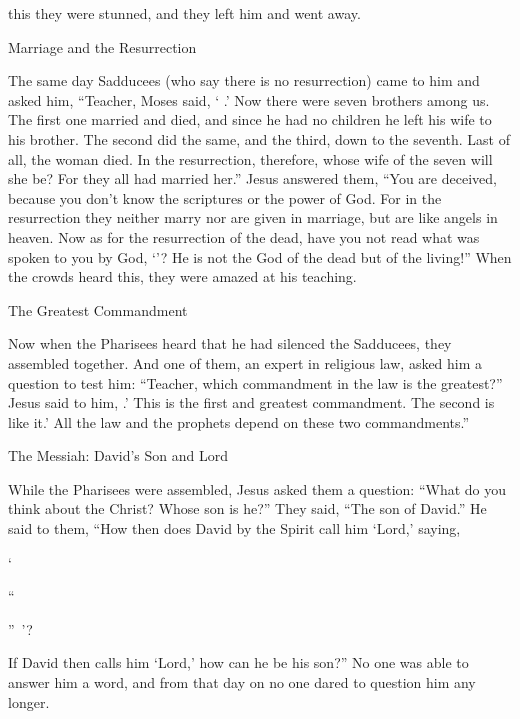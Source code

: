 {this they were stunned,
and
they left
him
and went away.
\par }{\SH Marriage and the Resurrection
\par }{\PP {}The same
day
Sadducees
(who say
there is
no
resurrection) came
to him
and
asked
him,
“Teacher,
Moses
said, ‘{}
{}.’
Now there were
seven
brothers
among
us.
The first one
married
and
died,
and
since he had
no
children
he left
his
wife
to his
brother.
The second
did the same,
and
the third,
down to
the seventh.
Last
of all,
the woman
died.
In
the resurrection,
therefore,
whose
wife of the seven
will
she
be? For
they
all
had married
her.”
Jesus
answered
them,
“You are deceived,
because you don’t
know
the scriptures
or
the power
of God.
For
in
the resurrection
they
neither
marry
nor
are given in marriage,
but
are
like
angels
in
heaven.
Now as for
the resurrection
of the dead,
have you
not
read
what was spoken
to you
by
God,
‘{}’? He is
not
the God
of the dead
but
of the living!”
When
the crowds
heard
this, they were amazed
at
his
teaching.
\par }{\SH The Greatest Commandment
\par }{\PP {}Now
when
the Pharisees
heard
that
he had silenced
the Sadducees,
they assembled together.
And
one
of
them,
an expert in religious law,
asked
him a question to test
him:
“Teacher,
which
commandment
in
the law
is the greatest?”
Jesus said
to him,
{}.’
This
is
the first
and
greatest
commandment.
The second
is like
it{}.’
All
the law
and
the prophets
depend
on
these
two
commandments.”
\par }{\SH The Messiah: David’s Son and Lord
\par }{\PP {}While
the Pharisees
were assembled,
Jesus
asked
them a question:
“What
do
you
think
about
the Christ? Whose
son
is he?” They said,
“The son of David.”
He said
to them,
“How
then
does David
by
the Spirit
call
him
‘Lord,’
saying,
\par }{\Q {}‘{}
\par }{\Q “{}
\par }{” ’?
\par }{\PI {}If
David
then
calls
him
‘Lord,’
how can
he be
his
son?”
No
one was able
to answer
him
a word,
and from
that
day
on no one
dared
to question
him
any longer.

}
